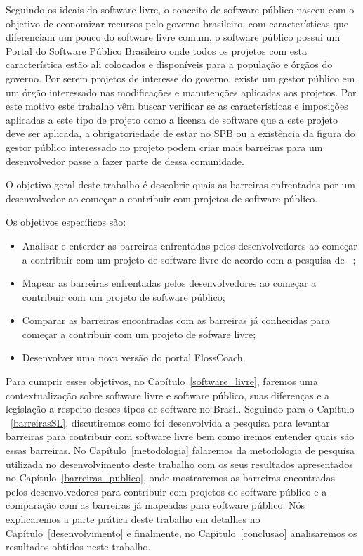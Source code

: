 Seguindo os ideais do software livre, o conceito de software público nasceu com o
objetivo de economizar recursos pelo governo brasileiro, com características que 
diferenciam um pouco do software livre comum, o software público possui um
Portal do Software Público Brasileiro onde todos os projetos com esta característica
estão ali colocados e disponíveis para a população e órgãos do governo. Por serem
projetos de interesse do governo, existe um gestor público em um órgão interessado 
nas modificações e manutenções aplicadas aos projetos. Por este motivo este trabalho 
vêm buscar verificar se as características e imposições aplicadas a este tipo de projeto 
como a licensa de software que a este projeto deve ser aplicada, a obrigatoriedade de
estar no SPB ou a existência da figura do gestor público interessado no projeto podem
criar mais barreiras para um desenvolvedor passe a fazer parte de dessa comunidade.


O objetivo geral deste trabalho é descobrir quais as barreiras enfrentadas por um 
desenvolvedor ao começar a contribuir com projetos de software público.

Os objetivos específicos são:

\begin{itemize}
\item Analisar e enterder as barreiras enfrentadas pelos desenvolvedores ao começar
a contribuir com um projeto de software livre de acordo com a pesquisa de ~;
\item Mapear as barreiras enfrentadas pelos desenvolvedores ao começar a contribuir
com um projeto de software público;
\item Comparar as barreiras encontradas com as barreiras já conhecidas para começar 
a contribuir com um projeto de sofware livre;
\item Desenvolver uma nova versão do portal FlossCoach.
\end{itemize}

Para cumprir esses objetivos, no Capítulo~\ref{software_livre}, faremos uma 
contextualização sobre software livre e software público, suas diferenças e a 
legislação a respeito desses tipos de software no Brasil. Seguindo para o Capítulo
~\ref{barreirasSL}, discutiremos como foi desenvolvida a pesquisa para levantar
barreiras para contribuir com software livre bem como iremos entender quais são
essas barreiras. No Capítulo~\ref{metodologia} falaremos da metodologia de pesquisa
utilizada no desenvolvimento deste trabalho com os seus resultados apresentados no
Capítulo~\ref{barreiras_publico}, onde mostraremos as barreiras encontradas pelos
desenvolvedores para contribuir com projetos de software público e a comparação com 
as barreiras já mapeadas para software público. Nós explicaremos a parte prática deste
trabalho em detalhes no Capítulo~\ref{desenvolvimento} e finalmente, no Capítulo~\ref{conclusao}
analisaremos os resultados obtidos neste trabalho.


